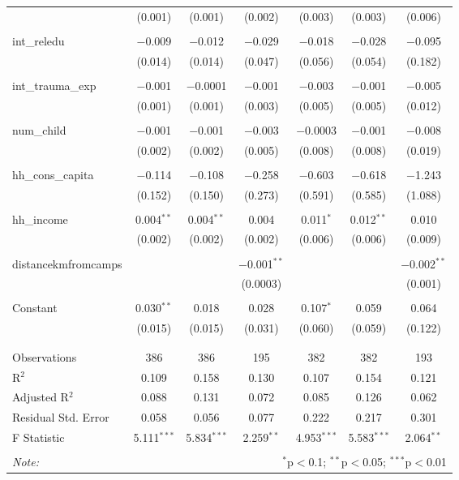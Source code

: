 \begin{table}[H]
\begin{tabular}{@{\extracolsep{4pt}}lcccccc}
  & (0.001) & (0.001) & (0.002) & (0.003) & (0.003) & (0.006) \\ 
  & & & & & & \\ 
 int\_reledu & $-$0.009 & $-$0.012 & $-$0.029 & $-$0.018 & $-$0.028 & $-$0.095 \\ 
  & (0.014) & (0.014) & (0.047) & (0.056) & (0.054) & (0.182) \\ 
  & & & & & & \\ 
 int\_trauma\_exp & $-$0.001 & $-$0.0001 & $-$0.001 & $-$0.003 & $-$0.001 & $-$0.005 \\ 
  & (0.001) & (0.001) & (0.003) & (0.005) & (0.005) & (0.012) \\ 
  & & & & & & \\ 
 num\_child & $-$0.001 & $-$0.001 & $-$0.003 & $-$0.0003 & $-$0.001 & $-$0.008 \\ 
  & (0.002) & (0.002) & (0.005) & (0.008) & (0.008) & (0.019) \\ 
  & & & & & & \\ 
 hh\_cons\_capita & $-$0.114 & $-$0.108 & $-$0.258 & $-$0.603 & $-$0.618 & $-$1.243 \\ 
  & (0.152) & (0.150) & (0.273) & (0.591) & (0.585) & (1.088) \\ 
  & & & & & & \\ 
 hh\_income & 0.004$^{**}$ & 0.004$^{**}$ & 0.004 & 0.011$^{*}$ & 0.012$^{**}$ & 0.010 \\ 
  & (0.002) & (0.002) & (0.002) & (0.006) & (0.006) & (0.009) \\ 
  & & & & & & \\ 
 distancekmfromcamps &  &  & $-$0.001$^{**}$ &  &  & $-$0.002$^{**}$ \\ 
  &  &  & (0.0003) &  &  & (0.001) \\ 
  & & & & & & \\ 
 Constant & 0.030$^{**}$ & 0.018 & 0.028 & 0.107$^{*}$ & 0.059 & 0.064 \\ 
  & (0.015) & (0.015) & (0.031) & (0.060) & (0.059) & (0.122) \\ 
  & & & & & & \\ 
\hline \\[-1.8ex] 
Observations & 386 & 386 & 195 & 382 & 382 & 193 \\ 
R$^{2}$ & 0.109 & 0.158 & 0.130 & 0.107 & 0.154 & 0.121 \\ 
Adjusted R$^{2}$ & 0.088 & 0.131 & 0.072 & 0.085 & 0.126 & 0.062 \\ 
Residual Std. Error & 0.058 & 0.056 & 0.077 & 0.222 & 0.217 & 0.301 \\ 
F Statistic & 5.111$^{***}$ & 5.834$^{***}$ & 2.259$^{**}$ & 4.953$^{***}$ & 5.583$^{***}$ & 2.064$^{**}$ \\ 
\hline 
\hline \\[-1.8ex] 
\textit{Note:}  & \multicolumn{6}{r}{$^{*}$p$<$0.1; $^{**}$p$<$0.05; $^{***}$p$<$0.01} \\ 
\end{tabular} 
\end{table} 
